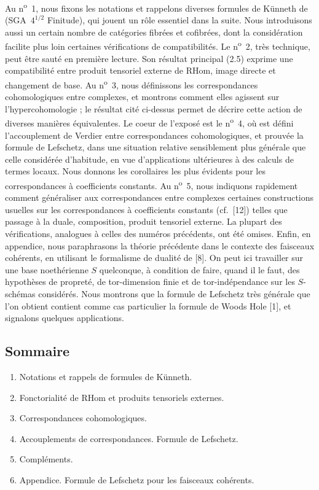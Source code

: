 \documentclass[11pt]{article}
\providecommand{\RHom}{\mathrm{RHom}}
\providecommand{\RHom}{\mathrm{RHom}}
\begin{document}
Au n\textsuperscript{o}~1, nous fixons les notations et rappelons diverses formules de Künneth de (SGA~$4^{1/2}$ Finitude), qui jouent un rôle essentiel dans la suite. Nous introduisons aussi un certain nombre de catégories fibrées et cofibrées, dont la considération facilite plus loin certaines vérifications de compatibilités. Le n\textsuperscript{o}~2, très technique, peut être sauté en première lecture. Son résultat principal (2.5) exprime une compatibilité entre produit tensoriel externe de $\RHom$, image directe et changement de base. Au n\textsuperscript{o}~3, nous définissons les correspondances cohomologiques entre complexes, et montrons comment elles agissent sur l'hypercohomologie ; le résultat cité ci-dessus permet de décrire cette action de diverses manières équivalentes. Le coeur de l'exposé est le n\textsuperscript{o}~4, où est défini l'accouplement de Verdier entre correspondances cohomologiques, et prouvée la formule de Lefschetz, dans une situation relative sensiblement plus générale que celle considérée d'habitude, en vue d'applications ultérieures à des calculs de termes locaux. Nous donnons les corollaires les plus évidents pour les correspondances à coefficients constants. Au n\textsuperscript{o}~5, nous indiquons rapidement comment généraliser aux correspondances entre complexes certaines constructions usuelles sur les correspondances à coefficients constants (cf.~[12]) telles que passage à la duale, composition, produit tensoriel externe. La plupart des vérifications, analogues à celles des numéros précédents, ont été omises. Enfin, en appendice, nous paraphrasons la théorie précédente dans le contexte des faisceaux cohérents, en utilisant le formalisme de dualité de [8]. On peut ici travailler sur une base noethérienne $S$ quelconque, à condition de faire, quand il le faut, des hypothèses de propreté, de tor-dimension finie et de tor-indépendance sur les $S$-schémas considérés. Nous montrons que la formule de Lefschetz très générale que l'on obtient contient comme cas particulier la formule de Woods Hole [1], et signalons quelques applications.

\subsection*{Sommaire}
\begin{enumerate}[label=\arabic*.]
\item Notations et rappels de formules de Künneth.
\item Fonctorialité de $\RHom$ et produits tensoriels externes.
\item Correspondances cohomologiques.
\item Accouplements de correspondances. Formule de Lefschetz.
\item Compléments.
\item Appendice. Formule de Lefschetz pour les faisceaux cohérents.
\end{enumerate}
\end{document}
